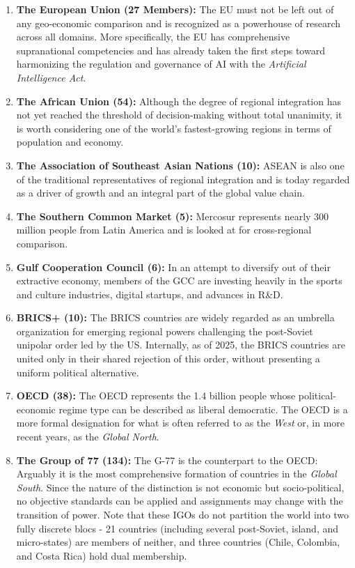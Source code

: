 \documentclass{article}
\begin{document}
	
	\begin{enumerate}
		\item \textbf{The European Union (27 Members):} The EU must not be left out of any geo-economic comparison and is recognized as a powerhouse of research across all domains. More specifically, the EU has comprehensive supranational competencies and has already taken the first steps toward harmonizing the regulation and governance of AI with the \textit{Artificial Intelligence Act}.
		\item \textbf{The African Union (54):} Although the degree of regional integration has not yet reached the threshold of decision-making without total unanimity, it is worth considering one of the world's fastest-growing regions in terms of population and economy.
		\item  \textbf{The Association of Southeast Asian Nations (10):} ASEAN is also one of the traditional representatives of regional integration and is today regarded as a driver of growth and an integral part of the global value chain.
		\item \textbf{The Southern Common Market (5):} Mercosur represents nearly 300 million people from Latin America and is looked at for cross-regional comparison.
		\item \textbf{Gulf Cooperation Council (6):} In an attempt to diversify out of their extractive economy, members of the GCC are investing heavily in the sports and culture industries, digital startups, and advances in R\&D.
		\item \textbf{BRICS+ (10):} The BRICS countries are widely regarded as an umbrella organization for emerging regional powers challenging the post-Soviet unipolar order led by the US. Internally, as of 2025, the BRICS countries are united only in their shared rejection of this order, without presenting a uniform political alternative.
		\item \textbf{OECD (38):} The OECD represents the 1.4 billion people whose political-economic regime type can be described as liberal democratic. The OECD is a more formal designation for what is often referred to as the \textit{West} or, in more recent years, as the \textit{Global North}.
		\item \textbf{The Group of 77 (134):} The G-77 is the counterpart to the OECD: Arguably it is the most comprehensive formation of countries in the \textit{Global South}. Since the nature of the distinction is not economic but socio-political, no objective standards can be applied and assignments may change with the transition of power. Note that these IGOs do not partition the world into two fully discrete blocs - 21 countries (including several post-Soviet, island, and micro-states) are members of neither, and three countries (Chile, Colombia, and Costa Rica) hold dual membership.
	\end{enumerate}
	
\end{document}
